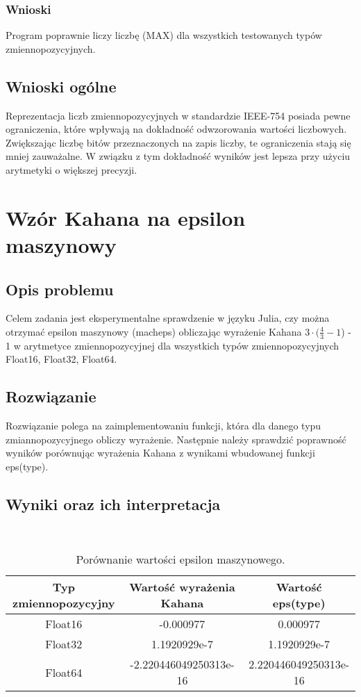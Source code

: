 \documentclass{article}
\begin{document}
\subsubsection{Wnioski}
Program poprawnie liczy liczbę (MAX) dla wszystkich testowanych typów zmiennopozycyjnych.
\subsection{Wnioski ogólne}
Reprezentacja liczb zmiennopozycyjnych w standardzie IEEE-754 posiada pewne ograniczenia, które wpływają na dokładność odwzorowania wartości liczbowych. Zwiększając liczbę bitów przeznaczonych na zapis liczby, te ograniczenia stają się mniej zauważalne. W związku z tym dokładność wyników jest lepsza przy użyciu arytmetyki o większej precyzji.
\section{Wzór Kahana na epsilon maszynowy}
\subsection{Opis problemu}
Celem zadania jest eksperymentalne sprawdzenie w języku Julia, czy można otrzymać epsilon maszynowy (macheps) obliczając wyrażenie Kahana \(3\cdot (\frac{4}{3} - 1\)) - 1 w arytmetyce zmiennopozycyjnej dla wszystkich typów zmiennopozycyjnych Float16, Float32, Float64.
\subsection{Rozwiązanie}
Rozwiązanie polega na zaimplementowaniu funkcji, która dla danego typu zmiannopozycyjnego obliczy wyrażenie. Następnie należy sprawdzić poprawność wyników porównując wyrażenia Kahana z wynikami wbudowanej funkcji eps(type).
\subsection{Wyniki oraz ich interpretacja}\
\begin{table}[H]
\centering
\begin{tabular}{|c|c|c|}
\hline
	Typ zmiennopozycyjny & Wartość wyrażenia Kahana  & Wartość eps(type)\\
\hline
	Float16 & -0.000977 & 0.000977\\
\hline
	Float32 & 1.1920929e-7 & 1.1920929e-7\\
\hline
	Float64 & -2.220446049250313e-16 & 2.220446049250313e-16\\
\hline
\end{tabular}
\caption{Porównanie wartości epsilon maszynowego.}
\end{table}
\end{document}
